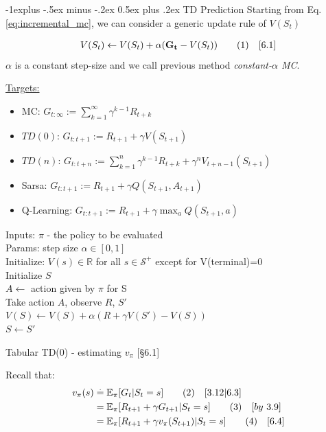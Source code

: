 \documentclass[10pt,landscape]{article}
\makeatletter
\renewcommand{\subsection}{\@startsection{subsection}{2}{0mm}%
                                {-1explus -.5ex minus -.2ex}%
                                {0.5ex plus .2ex}%
                                {\normalfont\normalsize\bfseries}}
\newcommand\numberthis{\addtocounter{equation}{1}\tag{\theequation}}
\makeatother
\begin{document}
\begin{multicols}{3}
\subsection{TD Prediction}
Starting from Eq. \ref{eq:incremental_mc}, we can consider a generic update rule of $V(S_t)$

\begin{align*}
V(S_t) \leftarrow V(S_t) + \alpha (\mathbf{G_t} - V(S_t)) \label{eq:constant_alpha_mc}\numberthis \quad [6.1]
\end{align*}
$\alpha$ is a constant step-size and we call previous method \emph{constant-$\alpha$ MC}.

\underline{Targets:}
\begin{itemize}
    \item MC: $G_{t:\infty} := \sum_{k=1}^\infty \gamma^{k-1}R_{t+k}$
    \item $TD(0)$: $G_{t:t+1} := R_{t+1} + \gamma V(S_{t+1})$
    \item $TD(n)$: $G_{t:t+n} := \sum_{k=1}^n \gamma^{k-1} R_{t+k} + \gamma^n V_{t+n-1}(S_{t+1})$ 
    \item Sarsa: $G_{t:t+1} := R_{t+1} + \gamma Q(S_{t+1}, A_{t+1})$
    \item Q-Learning: $G_{t:t+1} := R_{t+1} + \gamma \max_a Q(S_{t+1}, a)$
\end{itemize}

\begin{algorithm}[H]
Inputs: $\pi$ - the policy to be evaluated \\
Params: step size $\alpha \in [0,1]$ \\
Initialize: $V(s) \in \mathbb{R}$ for all $s \in \mathcal{S}^+$ except for V(terminal)=0 \\

{
    Initialize $S$\\
    {
    	$A \leftarrow$ action given by $\pi$ for S\\
    	Take action $A$, observe $R$, $S'$\\
    	$V(S) \leftarrow V(S) + \alpha (R + \gamma V(S') - V(S))$ \\
    	$S \leftarrow S'$   
    }
 }
\caption{Tabular TD(0) - estimating $v_{\pi}$ [§6.1]}
\end{algorithm}

Recall that:
\begin{align*}
v_{\pi}(s) & \stackrel{.}{=} \mathbb{E}_{\pi}[G_t | S_t = s]  \label{eq:v_pi_MC} \numberthis  \quad [3.12 | 6.3]\\
& = \mathbb{E}_{\pi}[R_{t+1} + \gamma G_{t+1} | S_t = s] \label{eq:v_pi_MC2}  \numberthis  \quad [by \ 3.9] \\
& = \mathbb{E}_{\pi}[R_{t+1} + \gamma v_{\pi}(S_{t+1}) | S_t = s] \label{eq:v_pi_TD} \numberthis  \quad [6.4] \\
\end{align*}


\end{multicols}
\end{document}
